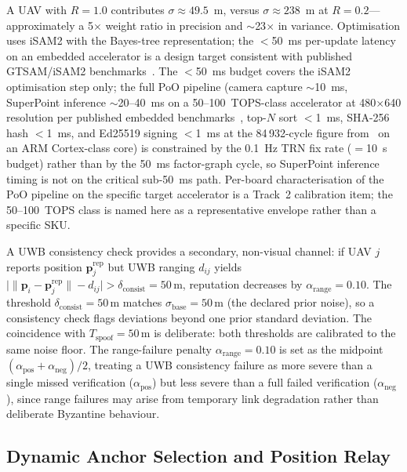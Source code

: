 \documentclass[conference,10pt]{IEEEtran}
\begin{document}
A UAV with $R = 1.0$ contributes $\sigma \approx 49.5$~m, versus $\sigma \approx 238$~m at $R = 0.2$---approximately a 5$\times$ weight ratio in precision and $\sim$23$\times$ in variance. Optimisation uses iSAM2 with the Bayes-tree representation; the $<$50~ms per-update latency on an embedded accelerator is a design target consistent with published GTSAM/iSAM2 benchmarks~\cite{kaess2012isam2}. The $<$50~ms budget covers the iSAM2 optimisation step only; the full PoO pipeline (camera capture $\sim$10~ms, SuperPoint inference $\sim$20--40~ms on a 50--100~TOPS-class accelerator at 480$\times$640 resolution per published embedded benchmarks~\cite{detone2018superpoint}, top-$N$ sort $<$1~ms, SHA-256 hash $<$1~ms, and Ed25519 signing $<$1~ms at the 84\,932-cycle figure from~\cite{bernstein2012ed25519} on an ARM Cortex-class core) is constrained by the 0.1~Hz TRN fix rate ($=$10~s budget) rather than by the 50~ms factor-graph cycle, so SuperPoint inference timing is not on the critical sub-50~ms path. Per-board characterisation of the PoO pipeline on the specific target accelerator is a Track~2 calibration item; the 50--100~TOPS class is named here as a representative envelope rather than a specific SKU.%

A UWB consistency check provides a secondary, non-visual channel: if UAV $j$ reports position $\mathbf{p}_j^\text{rep}$ but UWB ranging $d_{ij}$ yields $\bigl| \lVert \mathbf{p}_i - \mathbf{p}_j^\text{rep} \rVert - d_{ij} \bigr| > \delta_\text{consist} = 50$\,m, reputation decreases by $\alpha_\text{range} = 0.10$. The threshold $\delta_\text{consist} = 50$\,m matches $\sigma_\text{base}=50$\,m (the declared prior noise), so a consistency check flags deviations beyond one prior standard deviation. The coincidence with $T_\text{spoof}=50$\,m is deliberate: both thresholds are calibrated to the same noise floor. The range-failure penalty $\alpha_\text{range} = 0.10$ is set as the midpoint $(\alpha_\text{pos}+\alpha_\text{neg})/2$, treating a UWB consistency failure as more severe than a single missed verification ($\alpha_\text{pos}$) but less severe than a full failed verification ($\alpha_\text{neg}$), since range failures may arise from temporary link degradation rather than deliberate Byzantine behaviour.

\subsection{Dynamic Anchor Selection and Position Relay}
\end{document}
